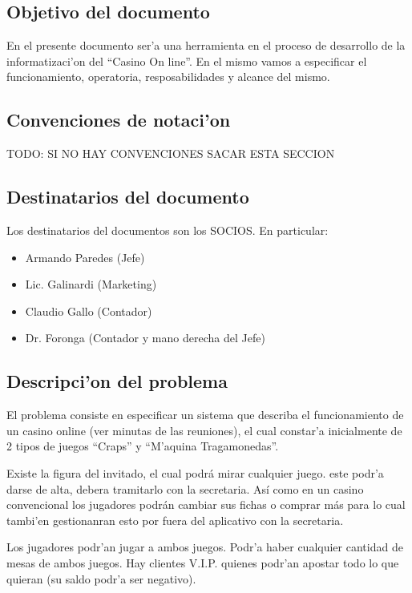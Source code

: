 \subsection{ Objetivo del documento	}

En el presente documento ser'a una herramienta en el proceso 
de desarrollo de la informatizaci'on del ``Casino On line''. En el mismo 
vamos a especificar el funcionamiento, operatoria, resposabilidades y alcance
del mismo.


\subsection{ Convenciones de notaci'on	}
TODO: SI NO HAY CONVENCIONES SACAR ESTA SECCION

\subsection{ Destinatarios del documento	}
Los destinatarios del documentos son los SOCIOS. En particular:

\begin{itemize}
    \item Armando Paredes (Jefe)
    \item Lic. Galinardi (Marketing)
    \item Claudio Gallo (Contador)
    \item Dr. Foronga (Contador y mano derecha del Jefe)
\end{itemize}


\subsection{ Descripci'on del problema }
El problema consiste en especificar un sistema que describa el funcionamiento
de un casino online (ver minutas de las reuniones),
el cual constar'a inicialmente de 2 tipos de juegos  ``Craps'' y ``M'aquina Tragamonedas''.

Existe la figura del invitado, el cual podrá mirar cualquier juego.
este podr'a darse de alta, debera tramitarlo con la secretaria.
Así como en un casino convencional los jugadores podrán cambiar 
sus fichas o comprar más para lo cual tambi'en gestionanran esto por fuera del aplicativo con 
la secretaria.

Los jugadores podr'an jugar a ambos juegos. Podr'a haber cualquier cantidad de mesas de ambos
juegos.
Hay clientes V.I.P. quienes podr'an apostar todo lo que quieran (su saldo podr'a ser negativo).

